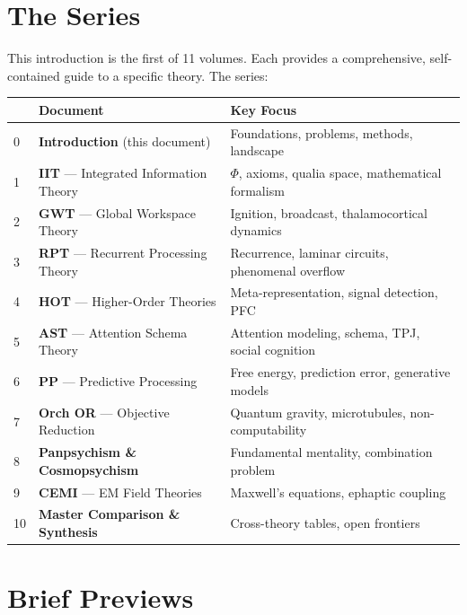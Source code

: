 \documentclass[11pt,a4paper]{report}
\begin{document}
\section{The Series}

\begin{seriesbox}
This introduction is the first of 11 volumes. Each provides a comprehensive, self-contained guide to a specific theory. The series:

\begin{center}
\renewcommand{\arraystretch}{1.35}
\begin{tabular}{>{\raggedright}p{0.5cm} >{\raggedright}p{5.5cm} >{\raggedright\arraybackslash}p{7cm}}
  \toprule
  & \textbf{Document} & \textbf{Key Focus} \\
  \midrule
  0 & \textbf{Introduction} (this document) & Foundations, problems, methods, landscape \\
  1 & \textbf{IIT} --- Integrated Information Theory & $\Phi$, axioms, qualia space, mathematical formalism \\
  2 & \textbf{GWT} --- Global Workspace Theory & Ignition, broadcast, thalamocortical dynamics \\
  3 & \textbf{RPT} --- Recurrent Processing Theory & Recurrence, laminar circuits, phenomenal overflow \\
  4 & \textbf{HOT} --- Higher-Order Theories & Meta-representation, signal detection, PFC \\
  5 & \textbf{AST} --- Attention Schema Theory & Attention modeling, schema, TPJ, social cognition \\
  6 & \textbf{PP} --- Predictive Processing & Free energy, prediction error, generative models \\
  7 & \textbf{Orch OR} --- Objective Reduction & Quantum gravity, microtubules, non-computability \\
  8 & \textbf{Panpsychism \& Cosmopsychism} & Fundamental mentality, combination problem \\
  9 & \textbf{CEMI} --- EM Field Theories & Maxwell's equations, ephaptic coupling \\
  10 & \textbf{Master Comparison \& Synthesis} & Cross-theory tables, open frontiers \\
  \bottomrule
\end{tabular}
\end{center}
\end{seriesbox}

\section{Brief Previews}
\end{document}

